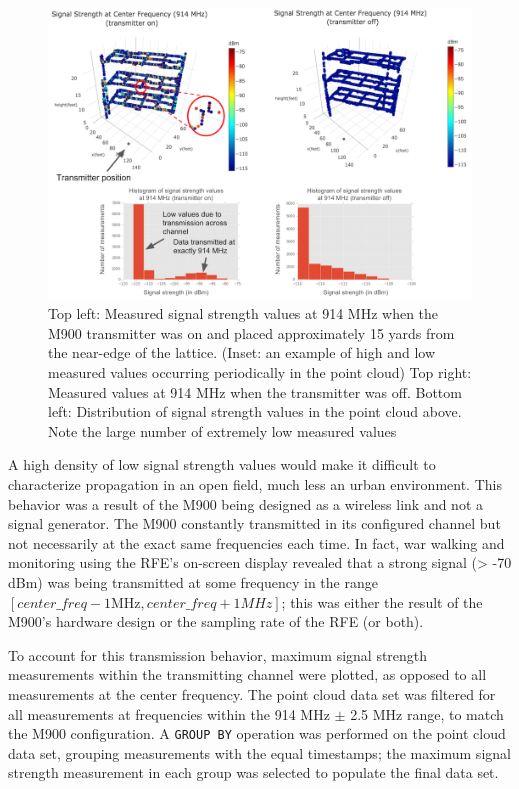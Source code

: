 \documentclass[pageno]{jpaper}
\begin{document}
\begin{figure}
	\caption{Top left: Measured signal strength values at 914 MHz when the M900 transmitter was on and placed approximately 15 yards from the near-edge of the lattice. (Inset: an example of high and low measured values occurring periodically in the point cloud) Top right: Measured values at 914 MHz when the transmitter was off. Bottom left: Distribution of signal strength values in the point cloud above. Note the large number of extremely low measured values }
	\centerline{\includegraphics{Sexton_1}}
\end{figure}

A high density of low signal strength values would make it difficult to characterize propagation in an open field, much less an urban environment. This behavior was a result of the M900 being designed as a wireless link and not a signal generator. The M900 constantly transmitted in its configured channel but not necessarily at the exact same frequencies each time. In fact, war walking and monitoring using the RFE's on-screen display revealed that a strong signal (> -70 dBm) was being transmitted at some frequency in the range $[center\_freq - 1 \text{MHz}, center\_freq + 1 MHz]$; this was either the result of the M900's hardware design or the sampling rate of the RFE (or both). 

To account for this transmission behavior, maximum signal strength measurements within the transmitting channel were plotted, as opposed to all measurements at the center frequency. The point cloud data set was filtered for all measurements at frequencies within the 914 MHz $\pm$ 2.5 MHz range, to match the M900 configuration.  A \texttt{GROUP BY} operation was performed on the point cloud data set, grouping measurements with the equal timestamps; the maximum signal strength measurement in each group was selected to populate the final data set. 
\end{document}
